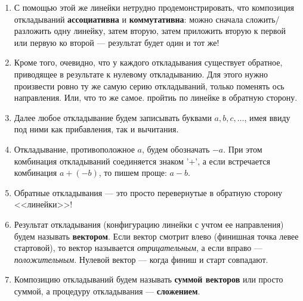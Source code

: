 \begin{enumerate}\setlength{\itemsep}{1pt}\setcounter{enumi}{7}
\item С помощью этой же линейки нетрудно продемонстрировать, что композиция откладываний \textbf{ассоциативна} и \textbf{коммутативна}: можно сначала сложить/разложить одну линейку, затем вторую, затем приложить вторую к первой или первую ко второй --- результат будет один и тот же!
\item Кроме того, очевидно, что у каждого откладывания существует обратное, приводящее в результате к нулевому откладыванию. Для этого нужно произвести ровно ту же самую серию откладываний, только поменять ось направления. Или, что то же самое. пройтиь по линейке в обратную сторону.
\item Далее любое откладывание будем записывать буквами $a,b,c,\dots$, имея ввиду под ними как прибавления, так и вычитания.
\item Откладывание, противоположное $a$, будем обозначать $-a$. При этом комбинация откладываний соединяется знаком '+', а если встречается комбинация $a+(-b)$, то пишем проще: $a-b$.
\item Обратные откладывания --- это просто перевернутые в обратную сторону <<линейки>>!
\item Результат откладывания (конфигурацию линейки с учтом ее направления) будем называть \textbf{вектором}. Если вектор смотрит влево (финишная точка левее стартовой), то вектор называется \textit{отрицательным}, а если вправо --- \textit{положительным}. Нулевой вектор --- когда финиш и старт совпадают.
\item Композицию откладываний будем называть \textbf{суммой векторов} или просто суммой, а процедуру откладывания --- \textbf{сложением}.
\end{enumerate}

